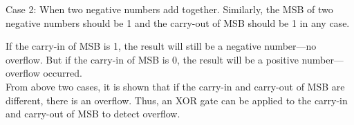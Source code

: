 \documentclass[12pt, a4paper]{article}
\begin{document}
	Case 2: When two negative numbers add together. Similarly, the MSB of two negative numbers should be 1 and the carry-out of MSB should be 1 in any case.

	If the carry-in of MSB is 1, the result will still be a negative number---no overflow. But if the carry-in of MSB is 0, the result will be a positive number---overflow occurred.
	\\

	From above two cases, it is shown that if the carry-in and carry-out of MSB are different, there is an overflow. Thus, an XOR gate can be applied to the carry-in and carry-out of MSB to detect overflow.
\end{document}
